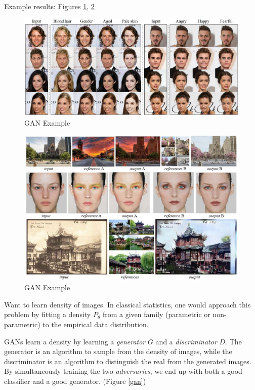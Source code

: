 \documentclass[english]{article}
\begin{document}
\item Example results: Figures \ref{gan1}, \ref{gan2}

\begin{figure}
  \centering
  \includegraphics[scale=0.25]{gan1.jpg}
    \caption{GAN Example}
    \label{gan1}
\end{figure}
\begin{figure}
  \centering
  \includegraphics[scale=0.3]{gan2.jpg}
    \caption{GAN Example}
    \label{gan2}
\end{figure}

\item 
 Want to learn density of images. In classical statistics, one would approach this problem by fitting a density $P_\theta$ from a given family (parametric or non-parametric) to the empirical data distribution. 

 GANs learn a density by learning a \emph{generator} $G$ and a \emph{discriminator} $D$. The generator is an algorithm to sample from the density of images, while the discriminator is an algorithm to distinguish the real from the generated images. By simultaneously training the two \emph{adversaries}, we end up with both a good classifier and a good generator. (Figure \ref{gan})
 
\end{document}
